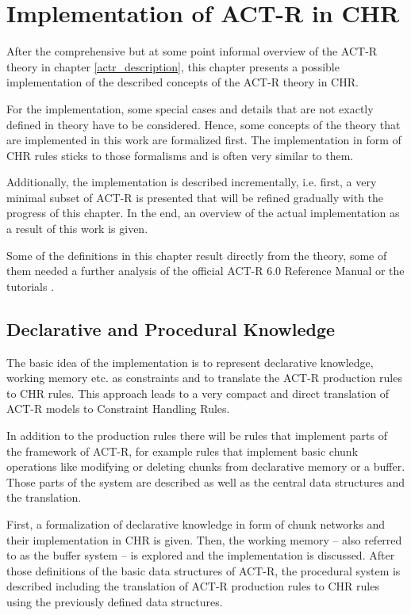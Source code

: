 \chapter{Implementation of ACT-R in CHR}
\label{implementation}

After the comprehensive but at some point informal overview of the ACT-R theory in chapter \ref{actr_description}, this chapter presents a possible implementation of the described concepts of the ACT-R theory in CHR.

For the implementation, some special cases and details that are not exactly defined in theory have to be considered. Hence, some concepts of the theory that are implemented in this work are formalized first. The implementation in form of CHR rules sticks to those formalisms and is often very similar to them.

Additionally, the implementation is described incrementally, i.e. first, a very minimal subset of ACT-R is presented that will be refined gradually with the progress of this chapter. In the end, an overview of the actual implementation as a result of this work is given.

Some of the definitions in this chapter result directly from the theory, some of them needed a further analysis of the official ACT-R 6.0 Reference Manual \cite{actr_reference} or the tutorials \cite{actr_tutorial}. 

\section{Declarative and Procedural Knowledge}

The basic idea of the implementation is to represent declarative knowledge, working memory etc. as constraints and to translate the ACT-R production rules to CHR rules. This approach leads to a very compact and direct translation of ACT-R models to Constraint Handling Rules.

In addition to the production rules there will be rules that implement parts of the framework of ACT-R, for example rules that implement basic chunk operations like modifying or deleting chunks from declarative memory or a buffer. Those parts of the system are described as well as the central data structures and the translation.

First, a formalization of declarative knowledge in form of chunk networks and their implementation in CHR is given. Then, the working memory -- also referred to as the buffer system -- is explored and the implementation is discussed. After those definitions of the basic data structures of ACT-R, the procedural system is described including the translation of ACT-R production rules to CHR rules using the previously defined data structures.

